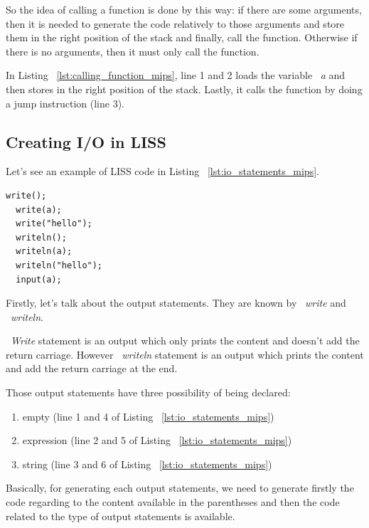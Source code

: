 \documentclass[
  oneside,
  11pt, a4paper,
  footinclude=true,
  headinclude=true,
  cleardoublepage=empty
]{scrbook}
\begin{document}
So the idea of calling a function is done by this way: if there are some arguments, then it is needed to generate the code relatively to those arguments and store them in the right position of the stack and finally, call the function. Otherwise if there is no arguments, then it must only call the function.

In Listing ~\ref{lst:calling_function_mips}, line 1 and 2 loads the variable ~\textit{a} and then stores in the right position of the stack. Lastly, it calls the function by doing a jump instruction (line 3).



\subsection{Creating I/O in LISS}


Let's see an example of LISS code in Listing ~\ref{lst:io_statements_mips}.

\begin{lstlisting}[caption={Example of I/O statements in LISS},label={lst:io_statements_mips}]
  write();
  write(a);
  write("hello");
  writeln();
  writeln(a);
  writeln("hello");
  input(a);
\end{lstlisting}

Firstly, let's talk about the output statements. They are known by ~\textit{write} and ~\textit{writeln}.

~\textit{Write} statement is an output which only prints the content and doesn't add the return carriage. However ~\textit{writeln} statement is an output which prints the content and add the return carriage at the end.

Those output statements have three possibility of being declared:

\begin{enumerate}
\item empty (line 1 and 4 of Listing ~\ref{lst:io_statements_mips})
\item expression (line 2 and 5 of Listing ~\ref{lst:io_statements_mips})
\item string (line 3 and 6 of Listing ~\ref{lst:io_statements_mips})
\end{enumerate}

Basically, for generating each output statements, we need to generate firstly the code regarding to the content available in the parentheses and then the code related to the type of output statements is available.
\end{document}
